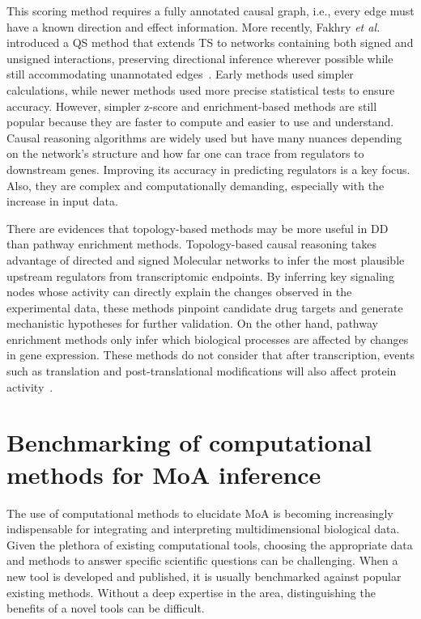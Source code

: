 This scoring method requires a fully annotated causal graph, i.e., every edge must have a known direction and effect information. 
More recently, Fakhry \textit{et al.}~\cite{RN158} introduced a \gls{QS} method that extends TS to networks containing both signed and unsigned interactions, preserving directional inference wherever possible while still accommodating unannotated edges~\cite{RN81}. 
Early methods used simpler calculations, while newer methods used more precise statistical tests to ensure accuracy. However, simpler z-score and enrichment-based methods are still popular because they are faster to compute and easier to use and understand. 
Causal reasoning algorithms are widely used but have many nuances depending on the network's structure and how far one can trace from regulators to downstream genes.
Improving its accuracy in predicting regulators is a key focus. Also, they are complex and computationally demanding, especially with the increase in input data.

There are evidences that topology-based methods may be more useful in \gls{DD} than pathway enrichment methods.
Topology-based causal reasoning takes advantage of directed and signed \gls{Molecular network}s to infer the most plausible upstream regulators from transcriptomic endpoints.
By inferring key signaling nodes whose activity can directly explain the changes observed in the experimental data, these methods pinpoint candidate drug targets and generate mechanistic hypotheses for further validation. 
On the other hand, pathway enrichment methods only infer which biological processes are affected by changes in gene expression.
These methods do not consider that after transcription, events such as translation and post-translational modifications will also affect protein activity~\cite{RN53}.

\section{Benchmarking of computational methods for MoA inference} %
\label{sec:benchmarkingofcomputationalmethodsforMoAinference}

The use of computational methods to elucidate \gls{MoA} is becoming increasingly indispensable for integrating and interpreting multidimensional biological data. 
Given the plethora of existing computational tools, choosing the appropriate data and methods to answer specific scientific questions can be challenging.
When a new tool is developed and published, it is usually benchmarked against popular existing methods.
Without a deep expertise in the area, distinguishing the benefits of a novel tools can be difficult. 


